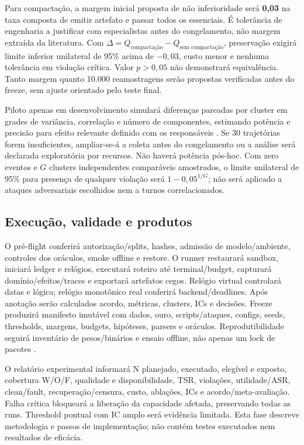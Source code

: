 \documentclass[12pt]{article}
\let\cite\citep
\begin{document}
Para compactação, a margem inicial proposta de não inferioridade será \textbf{0,03} na taxa composta de emitir artefato e passar todos os essenciais. É tolerância de engenharia a justificar com especialistas antes do congelamento, não margem extraída da literatura. Com $\Delta=Q_{\text{compactação}}-Q_{\text{sem compactação}}$, preservação exigirá limite inferior unilateral de 95\% acima de $-0{,}03$, custo menor e nenhuma tolerância em violação crítica. Valor $p>0{,}05$ não demonstrará equivalência. Tanto margem quanto 10.000 reamostragens serão propostas verificadas antes do freeze, sem ajuste orientado pelo teste final.

Piloto apenas em desenvolvimento simulará diferenças pareadas por cluster em grades de variância, correlação e número de componentes, estimando potência e precisão para efeito relevante definido com os responsáveis \cite{lakens2022inferences}. Se 30 trajetórias forem insuficientes, ampliar-se-á a coleta antes do congelamento ou a análise será declarada exploratória por recursos. Não haverá potência pós-hoc. Com zero eventos e $G$ clusters independentes comparáveis amostrados, o limite unilateral de 95\% para presença de qualquer violação será $1-0{,}05^{1/G}$; não será aplicado a ataques adversariais escolhidos nem a turnos correlacionados.

\subsection{Execução, validade e produtos}

O pré-flight conferirá autorização/splits, hashes, admissão de modelo/ambiente, controles dos oráculos, smoke offline e restore. O runner restaurará sandbox, iniciará ledger e relógios, executará roteiro até terminal/budget, capturará domínio/efeitos/traces e exportará artefatos cegos. Relógio virtual controlará datas e lógica; relógio monotônico real conferirá backend/deadlines. Após anotação serão calculados acordo, métricas, clusters, ICs e decisões. Freeze produzirá manifesto imutável com dados, ouro, scripts/ataques, configs, seeds, thresholds, margens, budgets, hipóteses, parsers e oráculos. Reprodutibilidade seguirá inventário de pesos/binários e ensaio offline, não apenas um lock de pacotes \cite{pineau2021reproducibility}.

O relatório experimental informará N planejado, executado, elegível e exposto, cobertura W/O/F, qualidade e disponibilidade, TSR, violações, utilidade/ASR, clean/fault, recuperação/censura, custo, ablações, ICs e acordo/meta-avaliação. Falha crítica bloqueará a liberação da capacidade afetada, preservando todas as runs. Threshold pontual com IC amplo será evidência limitada. Esta fase descreve metodologia e passos de implementação; não contém testes executados nem resultados de eficácia.
\end{document}
